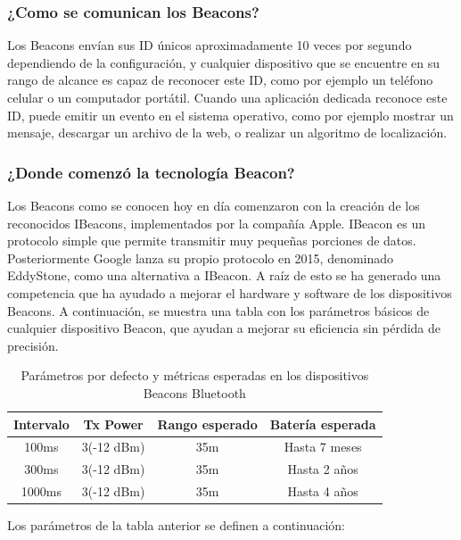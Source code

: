 \subsubsection{¿Como se comunican los Beacons?}

Los Beacons envían sus ID únicos aproximadamente 10 veces por segundo dependiendo de la configuración, y cualquier dispositivo que se encuentre en su rango de alcance es capaz de reconocer este ID, como por ejemplo un teléfono celular o un computador portátil. Cuando una aplicación dedicada reconoce este ID, puede emitir un evento en el sistema operativo, como por ejemplo mostrar un mensaje, descargar un archivo de la web, o realizar un algoritmo de localización.

\subsubsection{¿Donde comenzó la tecnología Beacon?}

Los Beacons como se conocen hoy en día comenzaron con la creación de los reconocidos IBeacons, implementados por la compañía Apple. IBeacon es un protocolo simple que permite transmitir muy pequeñas porciones de datos. Posteriormente Google lanza su propio protocolo en 2015, denominado EddyStone, como una alternativa a IBeacon. A raíz de esto se ha generado una competencia que ha ayudado a mejorar el hardware y software de los dispositivos Beacons. A continuación, se muestra una tabla con los parámetros básicos de cualquier dispositivo Beacon, que ayudan a mejorar su eficiencia sin pérdida de precisión.

\begin{table}[ht!]
\centering
\caption{Parámetros por defecto y métricas esperadas en los dispositivos Beacons Bluetooth}
\label{my-label}
\begin{tabular}{|c|c|c|c|}
\hline
Intervalo & Tx Power   & Rango esperado & Batería esperada \\ \hline
100ms     & 3(-12 dBm) & 35m            & Hasta 7 meses    \\ \hline
300ms     & 3(-12 dBm) & 35m            & Hasta 2 años     \\ \hline
1000ms    & 3(-12 dBm) & 35m            & Hasta 4 años     \\ \hline
\end{tabular}
\end{table}

Los parámetros de la tabla anterior se definen a continuación:

